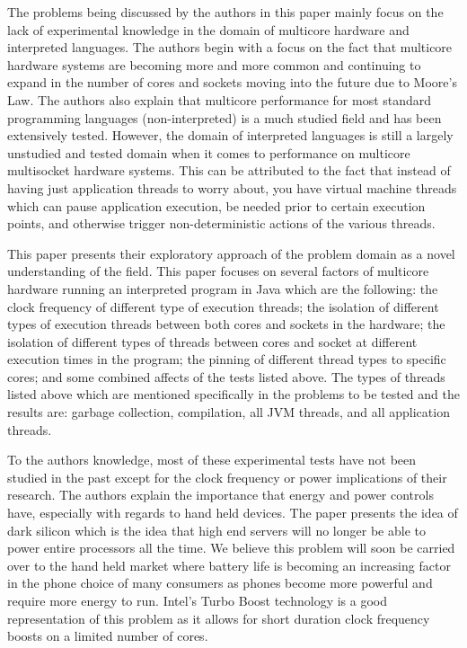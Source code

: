 \documentclass[conference]{IEEEtran}
\begin{document}
The problems being discussed by the authors in this paper mainly focus on the lack of 
experimental knowledge in the domain of multicore hardware and interpreted languages.
The authors begin with a focus on the fact that multicore hardware systems are becoming
more and more common and continuing to expand in the number of cores and sockets moving
into the future due to Moore's Law. The authors also explain that multicore performance
for most standard programming languages (non-interpreted) is a much studied field and
has been extensively tested. However, the domain of interpreted languages is still a largely
unstudied and tested domain when it comes to performance on multicore multisocket hardware
systems. This can be attributed to the fact that instead of having just application threads to
worry about, you have virtual machine threads which can pause application execution, be needed
prior to certain execution points, and otherwise trigger non-deterministic actions of the various threads.

This paper presents their exploratory approach of the problem domain as a novel understanding of 
the field. This paper focuses on several factors of multicore hardware running an interpreted
program in Java which are the following: the clock frequency of different type of execution threads; 
the isolation of different types of execution threads between both cores and sockets in the 
hardware; the isolation of different types of threads between cores and socket at different
execution times in the program; the pinning of different thread types to specific cores; and some
combined affects of the tests listed above. The types of threads listed above which are mentioned
specifically in the problems to be tested and the results are: garbage collection, compilation, 
all JVM threads, and all application threads.

To the authors knowledge, most of these experimental tests have not been studied in the past
except for the clock frequency or power implications of their research. The authors explain
the importance that energy and power controls have, especially with regards to hand held devices.
The paper presents the idea of dark silicon which is the idea that high end servers will no longer
be able to power entire processors all the time. We believe this problem will soon be carried
over to the hand held market where battery life is becoming an increasing factor in the phone choice
of many consumers as phones become more powerful and require more energy to run. Intel's Turbo
Boost technology is a good representation of this problem as it allows for short duration 
clock frequency boosts on a limited number of cores.
\end{document}
